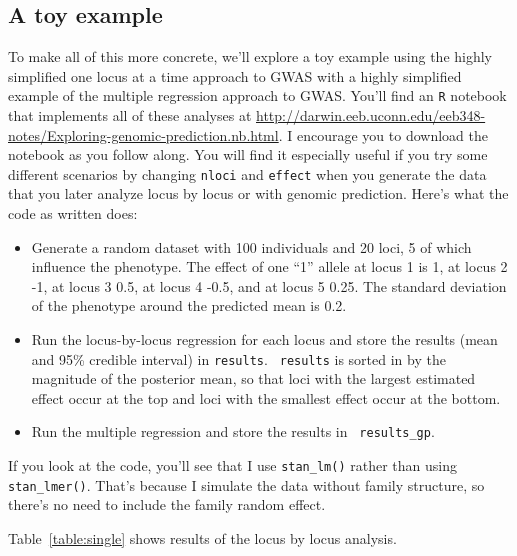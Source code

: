 \documentclass[12pt]{article}
\begin{document}
\subsection*{A toy example}

To make all of this more concrete, we'll explore a toy example using
the highly simplified one locus at a time approach to GWAS with a
highly simplified example of the multiple regression approach to
GWAS. You'll find an {\tt R} notebook that implements all of these
analyses at
\url{http://darwin.eeb.uconn.edu/eeb348-notes/Exploring-genomic-prediction.nb.html}. I
encourage you to download the notebook as you follow along. You will
find it especially useful if you try some different scenarios by
changing {\tt nloci} and {\tt effect} when you generate the data that
you later analyze locus by locus or with genomic prediction. Here's
what the code as written does:

\begin{itemize}

\item Generate a random dataset with 100 individuals and 20 loci, 5 of
  which influence the phenotype. The effect of one ``1'' allele at
  locus 1 is 1, at locus 2 -1, at locus 3 0.5, at locus 4 -0.5, and at
  locus 5 0.25. The standard deviation of the phenotype around the
  predicted mean is 0.2.

\item Run the locus-by-locus regression for each locus and store the
  results (mean and 95\% credible interval) in {\tt results}. {\tt
    results} is sorted in by the magnitude of the posterior mean, so
  that loci with the largest estimated effect occur at the top and
  loci with the smallest effect occur at the bottom.

\item Run the multiple regression and store the results in {\tt
    results\_gp}.  
    
\end{itemize}

If you look at the code, you'll see that I use {\tt stan\_lm()} rather
than using {\tt stan\_lmer()}. That's because I simulate the data without
family structure, so there's no need to include the family random
effect.

Table~\ref{table:single} shows results of the locus by locus analysis.
\end{document}
